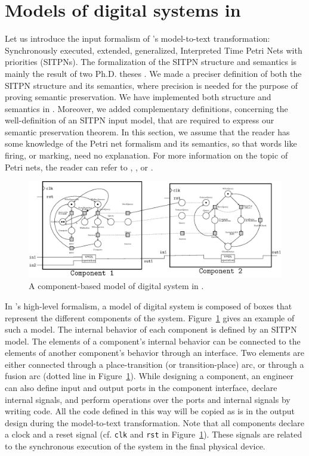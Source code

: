 \section{Models of digital systems in \hilecop{}}
\label{sec:hilecop-models}

Let us introduce the input formalism of \hilecop{}'s model-to-text
transformation: Synchronously executed, extended, generalized,
Interpreted Time Petri Nets with priorities (SITPNs). The
formalization of the SITPN structure and semantics is mainly the
result of two Ph.D. theses \cite{Leroux2014,Merzoug2018}. We made a
preciser definition of both the SITPN structure and its semantics,
where precision is needed for the purpose of proving semantic
preservation. We have implemented both structure and semantics in
\coq{}. Moreover, we added complementary definitions, concerning the
well-definition of an SITPN input model, that are required to express
our semantic preservation theorem. In this section, we assume that the
reader has some knowledge of the Petri net formalism and its
semantics, so that words like firing, or marking, need no
explanation. For more information on the topic of Petri nets, the
reader can refer to \cite{David1994}, \cite{Murata1989}, or
\cite{Diaz2001}.

\begin{figure}[H]
\centering
\includegraphics[keepaspectratio=true,width=\textwidth]{abs-model.eps}
\caption[An example of model of digital system in \hilecop{}.]{A
  component-based model of digital system in \hilecop{}.}
\label{fig:abs-model}
\end{figure}

In \hilecop{}'s high-level formalism, a model of digital system is
composed of boxes that represent the different components of the
system. Figure~\ref{fig:abs-model} gives an example of such a model.
The internal behavior of each component is defined by an SITPN model.
The elements of a component's internal behavior can be connected to
the elements of another component's behavior through an interface. Two
elements are either connected through a place-transition (or
transition-place) arc, or through a fusion arc (dotted line in
Figure~\ref{fig:abs-model}). While designing a component, an engineer
can also define input and output ports in the component interface,
declare internal signals, and perform operations over the ports and
internal signals by writing \vhdl{} code. All the \vhdl{} code defined
in this way will be copied as is in the output \vhdl{} design during
the model-to-text transformation. Note that all components declare a
clock and a reset signal (cf. \texttt{clk} and \texttt{rst} in
Figure~\ref{fig:abs-model}). These signals are related to the
synchronous execution of the system in the final physical device.

